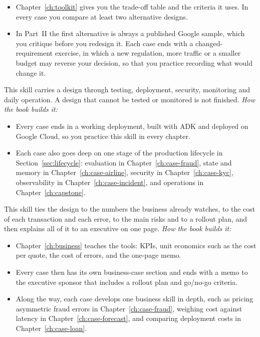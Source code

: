 \begin{description}[leftmargin=1em,itemsep=3pt]
\begin{itemize}
\item Chapter~\ref{ch:toolkit} gives you the trade-off table and the criteria it uses. In every case you compare at least two alternative designs. 
\item In Part~II the first alternative is always a published Google sample, which you critique before you redesign it. Each case ends with a changed-requirement exercise, in which a new regulation, more traffic or a smaller budget may reverse your decision, so that you practice recording what would change it.
\end{itemize}
  \item[Production.] This skill carries a design through testing, deployment, security, monitoring and daily operation. A design that cannot be tested or monitored is not finished. \emph{How the book builds it:} 
\begin{itemize}
\item  Every case ends in a working deployment, built with ADK and deployed on Google Cloud, so you practice this skill in every chapter. 
\item Each case also goes deep on one stage of the production lifecycle in Section~\ref{sec:lifecycle}: evaluation in Chapter~\ref{ch:case-fraud}, state and memory in Chapter~\ref{ch:case-airline}, security in Chapter~\ref{ch:case-kyc}, observability in Chapter~\ref{ch:case-incident}, and operations in Chapter~\ref{ch:capstone}.
\end{itemize}
  \item[Business justification.] This skill ties the design to the numbers the business already watches, to the cost of each transaction and each error, to the main risks and to a rollout plan, and then explains all of it to an executive on one page. \emph{How the book builds it:} 
\begin{itemize}  
\item  Chapter~\ref{ch:business} teaches the tools: KPIs, unit economics such as the cost per quote, the cost of errors, and the one-page memo. 
\item Every case then has its own business-case section and ends with a memo to the executive sponsor that includes a rollout plan and go/no-go criteria. 
\item Along the way, each case develops one business skill in depth, such as pricing asymmetric fraud errors in Chapter~\ref{ch:case-fraud}, weighing cost against latency in Chapter~\ref{ch:case-forecast}, and comparing deployment costs in Chapter~\ref{ch:case-loan}.
\end{itemize}
\end{description}

